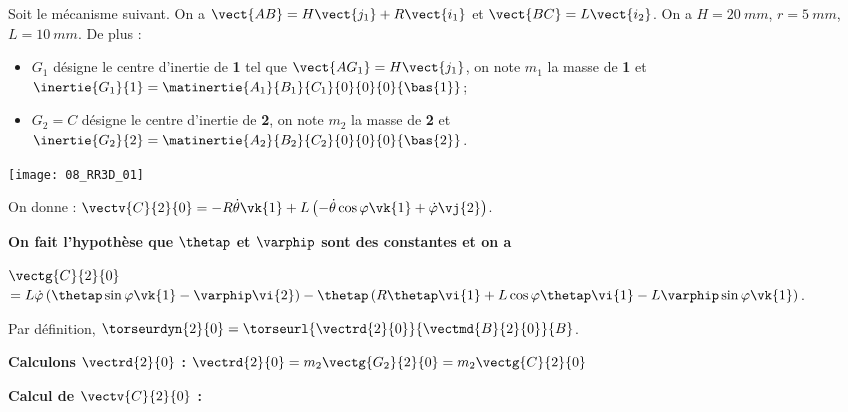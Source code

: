 \normalfalse \difficiletrue \tdifficilefalse
\correctionfalse


\setcounter{question}{0}%
\ifcorrection
\else
{}
\fi

\ifprof
\else
Soit le mécanisme suivant. On a $\vect{AB}=H\vect{j_1}+R\vect{i_1}$ et $\vect{BC}=L\vect{i_2}$. On a $H=\SI{20}{mm}$, $r=\SI{5}{mm}$, $L=\SI{10}{mm}$. De plus :
\begin{itemize}
\item $G_1$ désigne le centre d'inertie de \textbf{1} tel que $\vect{AG_1}=H\vect{j_1}$, on note $m_1$ la masse de \textbf{1} et $\inertie{G_1}{1}=\matinertie{A_1}{B_1}{C_1}{0}{0}{0}{\bas{1}}$; 
\item $G_2=C$ désigne le centre d'inertie de \textbf{2}, on note $m_2$ la masse de \textbf{2} et $\inertie{G_2}{2}=\matinertie{A_2}{B_2}{C_2}{0}{0}{0}{\bas{2}}$.
\end{itemize}
\begin{marginfigure}
\texttt{[image: 08\_RR3D\_01]}
\end{marginfigure}

\ifcolle
\else
On donne : 
$\vectv{C}{2}{0} = -R\dot{\theta}\vk{1}+L\left(-\dot{\theta}\cos\varphi\vk{1} + \dot{\varphi}\vj{2}\right)$.

\textbf{On fait l'hypothèse que $\thetap$ et $\varphip$ sont des constantes et on a }

$\vectg{C}{2}{0} $
$ =L\dot{\varphi}\left(\thetap\sin\varphi\vk{1}-\varphip\vi{2}\right)
-\thetap\left( R \thetap\vi{1} +L\cos\varphi \thetap\vi{1}
-L\varphip\sin\varphi\vk{1}\right)
$.
\fi


\fi

\ifprof


Par définition, $\torseurdyn{2}{0} = \torseurl{\vectrd{2}{0}}{\vectmd{B}{2}{0}}{B}$.

\textbf{Calculons $\vectrd{2}{0}$ : } 
$\vectrd{2}{0} = m_2\vectg{G_2}{2}{0}=m_2 \vectg{C}{2}{0} $

\textbf{Calcul de $\vectv{C}{2}{0}$ : }  

